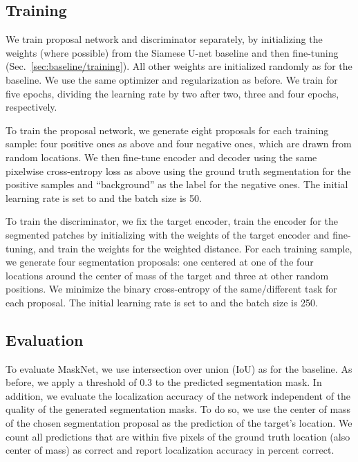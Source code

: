\documentclass{article}
\begin{document}
\subsection{Training}

We train proposal network and discriminator separately, by initializing the weights (where possible) from the Siamese U-net baseline and then fine-tuning (Sec.~\ref{sec:baseline/training}).
All other weights are initialized randomly as for the baseline.
We use the same optimizer and regularization as before.
We train for five epochs, dividing the learning rate by two after two, three and four epochs, respectively.

To train the proposal network, we generate eight proposals for each training sample: four positive ones as above and four negative ones, which are drawn from random locations.
We then fine-tune encoder and decoder using the same pixelwise cross-entropy loss as above using the ground truth segmentation for the positive samples and ``background'' as the label for the negative ones.
The initial learning rate is set to  and the batch size is 50.

To train the discriminator, we fix the target encoder, train the encoder for the segmented patches by initializing with the weights of the target encoder and fine-tuning, and train the weights for the weighted  distance.
For each training sample, we generate four segmentation proposals: one centered at one of the four locations around the center of mass of the target and three at other random positions.
We minimize the binary cross-entropy of the same/different task for each proposal.
The initial learning rate is set to  and the batch size is 250.





\subsection{Evaluation}
\label{sec:refined/evaluation}

To evaluate MaskNet, we use intersection over union (IoU) as for the baseline.
As before, we apply a threshold of 0.3 to the predicted segmentation mask.
In addition, we evaluate the localization accuracy of the network independent of the quality of the generated segmentation masks.
To do so, we use the center of mass of the chosen segmentation proposal as the prediction of the target's location.
We count all predictions that are within five pixels of the ground truth location (also center of mass) as correct and report localization accuracy in percent correct.
\end{document}
